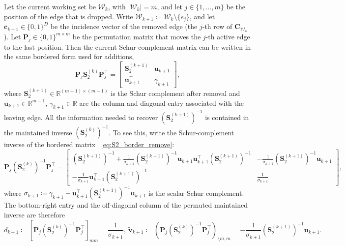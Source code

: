 \documentclass[a4paper,12pt,openany]{book}
\newcommand{\C}{\mathbf{C}}
\newcommand{\R}{\mathbb{R}}
\renewcommand{\c}{\mathbf{c}}
\renewcommand{\u}{\mathbf{u}}
\renewcommand{\v}{\mathbf{v}}
\begin{document}
\begin{appendices}
Let the current working set be $\mathcal{W}_k$, with $|\mathcal{W}_k|=m$, and let $j\in\{1,\dots,m\}$ be the position of the edge that is dropped. Write $\mathcal{W}_{k+1}\coloneqq\mathcal{W}_k\setminus\{e_j\}$, and let $\c_{k+1}\in\{0,1\}^D$ be the incidence vector of the removed edge (the $j$-th row of $\C_{\mathcal{W}_k}$). Let $\mathbf{P}_j\in\{0,1\}^{m\times m}$ be the permutation matrix that moves the $j$-th active edge to the last position. Then the current Schur-complement matrix can be written in the same bordered form used for additions,
\begin{equation}
	\label{eq:S2_border_remove}
	\mathbf{P}_j\mathbf{S}_2^{(k)}\mathbf{P}_j^\top
	=
	\begin{bmatrix}
		\mathbf{S}_2^{(k+1)} & \u_{k+1} \\
		\u_{k+1}^\top & \gamma_{k+1}
	\end{bmatrix},
\end{equation}
where $\mathbf{S}_2^{(k+1)}\in\R^{(m-1)\times(m-1)}$ is the Schur complement after removal and $\u_{k+1}\in\R^{m-1}$, $\gamma_{k+1}\in\R$ are the column and diagonal entry associated with the leaving edge. All the information needed to recover $(\mathbf{S}_2^{(k+1)})^{-1}$ is contained in the maintained inverse $(\mathbf{S}_2^{(k)})^{-1}$. To see this, write the Schur-complement inverse of the bordered matrix~
\eqref{eq:S2_border_remove}:
\begin{equation}
	\mathbf{P}_j(\mathbf{S}_2^{(k)})^{-1}\mathbf{P}_j^\top
	=
	\begin{bmatrix}
		(\mathbf{S}_2^{(k+1)})^{-1}+\frac{1}{\sigma_{k+1}}(\mathbf{S}_2^{(k+1)})^{-1}\u_{k+1}\u_{k+1}^\top(\mathbf{S}_2^{(k+1)})^{-1} & -\frac{1}{\sigma_{k+1}}(\mathbf{S}_2^{(k+1)})^{-1}\u_{k+1} \\[6pt]
		-\frac{1}{\sigma_{k+1}}\u_{k+1}^\top(\mathbf{S}_2^{(k+1)})^{-1} & \frac{1}{\sigma_{k+1}}
	\end{bmatrix},
\end{equation}
where $\sigma_{k+1}\coloneqq\gamma_{k+1}-\u_{k+1}^\top(\mathbf{S}_2^{(k+1)})^{-1}\u_{k+1}$ is the scalar Schur complement. The bottom-right entry and the off-diagonal column of the permuted maintained inverse are therefore
\begin{equation}
	d_{k+1}\coloneqq[\mathbf{P}_j(\mathbf{S}_2^{(k)})^{-1}\mathbf{P}_j^\top]_{mm}=\frac{1}{\sigma_{k+1}},
	\
	\tilde{\v}_{k+1}\coloneqq(\mathbf{P}_j(\mathbf{S}_2^{(k)})^{-1}\mathbf{P}_j^\top)_{\setminus m,m}=-\frac{1}{\sigma_{k+1}}(\mathbf{S}_2^{(k+1)})^{-1}\u_{k+1}.
\end{equation}

\end{appendices}
\end{document}
